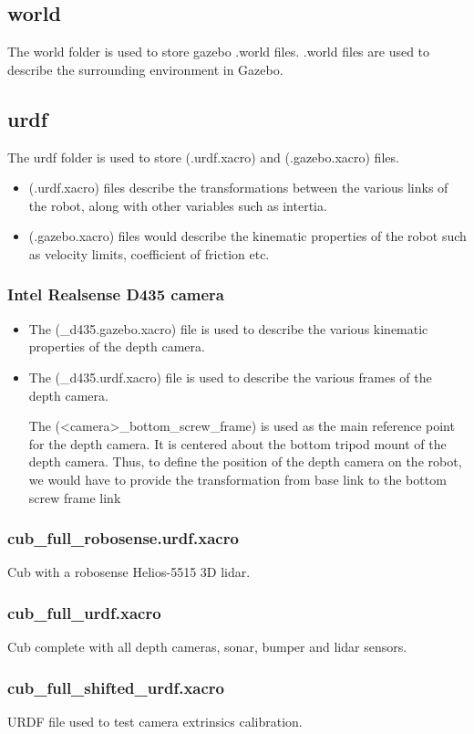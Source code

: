 \documentclass[11pt]{article}
\begin{document}
\subsection{world}
The world folder is used to store gazebo .world files. .world files are used to describe the surrounding environment in Gazebo.
\subsection{urdf}
The urdf folder is used to store (.urdf.xacro) and (.gazebo.xacro) files.
\begin{itemize}
 \item {
       (.urdf.xacro) files describe the transformations between the various links of the robot, along with other variables such as intertia.
       }
 \item{
       (.gazebo.xacro) files would describe the kinematic properties of the robot such as velocity limits, coefficient of friction etc.
       }
\end{itemize}
\subsubsection{Intel Realsense D435 camera}
\begin{itemize}
 \item {
       The (\_d435.gazebo.xacro) file is used to describe the various kinematic properties of the depth camera.
       }
 \item{
       The (\_d435.urdf.xacro) file is used to describe the various frames of the depth camera.
       
       The (<camera>\_bottom\_screw\_frame) is used as the main reference point for the depth camera. It is centered about the bottom tripod mount of the depth camera.
       Thus, to define the position of the depth camera on the robot, we would have to provide the transformation from base link to the bottom screw frame link
       }
\end{itemize}
\subsubsection{cub\_full\_robosense.urdf.xacro}
Cub with a robosense Helios-5515 3D lidar.
\subsubsection{cub\_full\_urdf.xacro}
Cub complete with all depth cameras, sonar, bumper and lidar sensors.
\subsubsection{cub\_full\_shifted\_urdf.xacro}
URDF file used to test camera extrinsics calibration.
\end{document}
